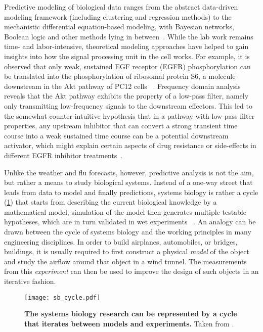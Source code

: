 Predictive modeling of biological data ranges from the 
abstract 
data-driven modeling framework (including clustering and 
regression methods) to the mechanistic differential 
equation-based modeling, with Bayesian networks, Boolean
logic and other methods lying in between~\citep{deJong2002}. 
While the lab work remains time- and labor-intensive, 
theoretical 
modeling approaches have helped to gain insights into how
the signal processing unit in the cell works.
For example, it is observed that only
weak, sustained EGF receptor (EGFR) phosphorylation can be
translated into the phosphorylation of ribosomal protein 
S6, a molecule downstream in the Akt pathway of PC12 cells~%
\citep{Fujita2010}. Frequency domain analysis reveals that 
the Akt pathway exhibits the property of a low-pass filter,
namely only transmitting low-frequency signals to the 
downstream effectors. This led to the somewhat 
counter-intuitive hypothesis that in a pathway with low-pass filter properties, any upstream inhibitor that can convert a strong transient time course into a weak sustained time course can be a potential downstream activator, which might 
explain certain aspects of drug resistance or side-effects
in different EGFR inhibitor treatments~\citep{Kosaka2011,
Lin2012}.

Unlike the weather and flu forecasts, however, predictive
analysis is not the aim, but rather a means to study 
biological systems. Instead of a one-way street that leads
from data to model and finally predictions, systems biology
is rather a cycle (\ref{fig:sb_cycle}) 
that starts from describing the current
biological knowledge by a mathematical model, simulation of
the model then generates multiple testable hypotheses, which
are in turn validated in wet experiments~%
\citep{Kitano2002e}. An analogy can be drawn between the
cycle of systems biology and the working principles in many
engineering disciplines. In order to build airplanes, 
automobiles, or bridges, buildings, it is usually required
to first construct a physical \emph{model} of the object
and study the airflow around that object in a wind tunnel.
The measurements from this \emph{experiment} can then be 
used to improve the design of such objects in an iterative
fashion.

\begin{figure}[!ht]
\begin{center}
\texttt{[image: sb\_cycle.pdf]}
\end{center}
\caption[Cycle of systems biology]{{\bf The systems biology
research can be represented by a cycle that iterates between
models and experiments.} 
Taken from \cite{Kitano2002e}.
}
\label{fig:sb_cycle}
\end{figure}

